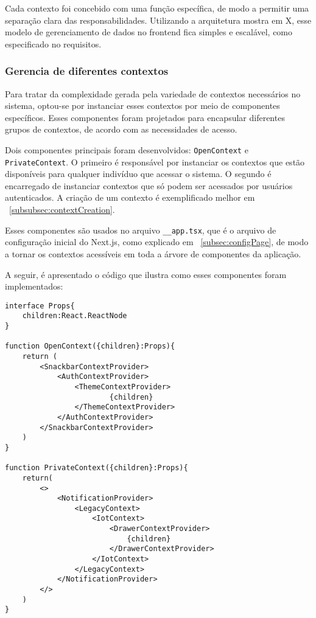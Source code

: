 Cada contexto foi concebido com uma função específica, de modo a permitir uma separação clara das responsabilidades. Utilizando a arquitetura mostra em X, esse modelo de gerenciamento de dados no frontend fica simples e escalável, como especificado no requisitos.%

\subsubsection{Gerencia de diferentes contextos}\label{subsubsec:difContexts}
Para tratar da complexidade gerada pela variedade de contextos necessários no sistema, optou-se por instanciar esses contextos por meio de componentes específicos. Esses componentes foram projetados para encapsular diferentes grupos de contextos, de acordo com as necessidades de acesso.

Dois componentes principais foram desenvolvidos: \texttt{OpenContext} e \texttt{PrivateContext}. O primeiro é responsável por instanciar os contextos que estão disponíveis para qualquer indivíduo que acessar o sistema. O segundo é encarregado de instanciar contextos que só podem ser acessados por usuários autenticados. A criação de um contexto é exemplificado melhor em ~\ref{subsubsec:contextCreation}.

Esses componentes são usados no arquivo \texttt{\_\_app.tsx}, que é o arquivo de configuração inicial do Next.js, como explicado em ~\ref{subsec:configPage}, de modo a tornar os contextos acessíveis em toda a árvore de componentes da aplicação.

A seguir, é apresentado o código que ilustra como esses componentes foram implementados:

\begin{verbatim}
interface Props{
    children:React.ReactNode
}

function OpenContext({children}:Props){
    return (
        <SnackbarContextProvider>
            <AuthContextProvider>
                <ThemeContextProvider>
                        {children}
                </ThemeContextProvider>
            </AuthContextProvider>
        </SnackbarContextProvider>
    )
}

function PrivateContext({children}:Props){
    return(
        <>
            <NotificationProvider>
                <LegacyContext>
                    <IotContext>
                        <DrawerContextProvider>
                            {children}
                        </DrawerContextProvider>
                    </IotContext>
                </LegacyContext>
            </NotificationProvider>
        </> 
    )
}
\end{verbatim}

